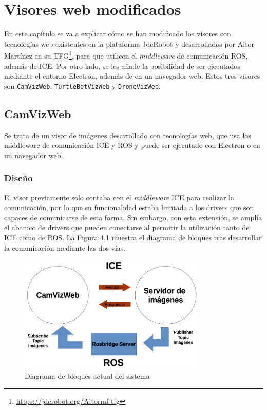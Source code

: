 \chapter{Visores web modificados}\label{cap.Visores}
En este capítulo se va a explicar cómo se han modificado los visores con tecnologías web existentes en la plataforma JdeRobot y desarrollados por Aitor Martínez en su TFG\footnote{\url{https://jderobot.org/Aitormf-tfg}}, para que utilicen el \textit{middleware} de comunicación ROS, además de ICE. Por otro lado, se les añade la posibilidad de ser ejecutados mediante el entorno Electron, además de en un navegador web. Estos tres visores son \texttt{CamVizWeb}, \texttt{TurtleBotVizWeb} y \texttt{DroneVizWeb}.

\section{CamVizWeb}
Se trata de un visor de imágenes desarrollado con tecnologías web, que usa los middleware de comunicación ICE y ROS  y puede ser ejecutado con Electron o en un navegador web.

\subsection{Diseño}
El visor previamente solo contaba con el \textit{middleware} ICE para realizar la comunicación, por lo que su funcionalidad estaba limitada a los drivers que son capaces de comunicarse de esta forma. Sin embargo, con esta extensión, se amplía el abanico de drivers que pueden conectarse al permitir la utilización tanto de ICE como de ROS. La Figura 4.1 muestra el diagrama de bloques tras desarrollar la comunicación mediante las dos vías.

\begin{figure}[H]
  \begin{center}
    \includegraphics[width=0.8\textwidth]{figures/esquemacamviz2.png}
		\caption{Diagrama de bloques actual del sistema}
		\label{fig.esquemacamviz2}
		\end{center}
\end{figure}

